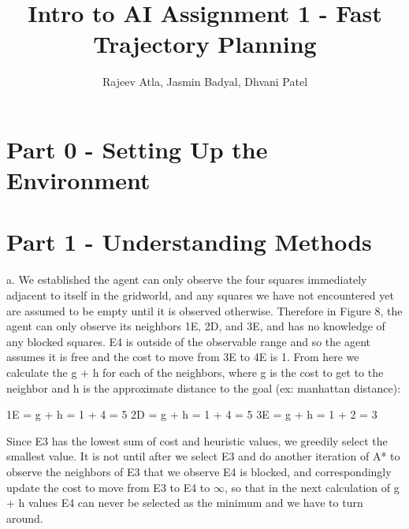 \documentclass[12pt]{article}
\begin{document}
\title{Intro to AI Assignment 1 - Fast Trajectory Planning}
\author{Rajeev Atla, Jasmin Badyal, Dhvani Patel}
\maketitle



\setcounter{section}{-1}
\section{Part 0 - Setting Up the Environment}


\section{Part 1 - Understanding Methods}

a. We established the agent can only observe the four squares immediately adjacent to itself in the gridworld, and any squares we have not encountered yet are assumed to be empty until it is observed otherwise.
Therefore in Figure 8, the agent can only observe its neighbors 1E, 2D, and 3E, and has no knowledge of any blocked squares. E4 is outside of the observable range and so the agent assumes it is free and the cost to move from 3E to 4E is 1.
From here we calculate the g + h for each of the neighbors, where g is the cost to get to the neighbor and h is the approximate distance to the goal (ex: manhattan distance):

1E = g + h = 1 + 4 = 5
2D = g + h = 1 + 4 = 5
3E = g + h = 1 + 2 = 3

Since E3 has the lowest sum of cost and heuristic values, we greedily select the smallest value. It is not until after we select E3 and do another iteration of A* to observe the neighbors of E3 that we observe E4 is blocked, and correspondingly update the cost to move from E3 to E4 to $\infty$, so that in the next calculation of g + h values E4 can never be selected as the minimum and we have to turn around.
\end{document}
